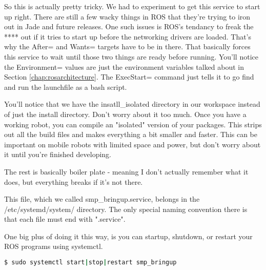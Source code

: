 So this is actually pretty tricky. We had to experiment to get this service to start up right. There are still a few wacky things in ROS that they're trying to iron out in Jade and future releases. One such issues is ROS's tendancy to freak the **** out if it tries to start up before the networking drivers are loaded. That's why the After= and Wants= targets have to be in there. That basically forces this service to wait until those two things are ready before running. You'll notice the Environment= values are just the environment variables talked about in Section \ref{chap:rosarchitecture}. The ExecStart= command just tells it to go find and run the launchfile as a bash script.

You'll notice that we have the insatll\_isolated directory in our workspace instead of just the install directory. Don't worry about it too much. Once you have a working robot, you can compile an "isolated" version of your packages. This strips out all the build files and makes everything a bit smaller and faster. This can be important on mobile robots with limited space and power, but don't worry about it until you're finished developing.

The rest is basically boiler plate - meaning I don't actually remember what it does, but everything breaks if it's not there.

This file, which we called smp\_bringup.service, belongs in the /etc/systemd/system/ directory. The only special naming convention there is that each file must end with ".service".

One big plus of doing it this way, is you can startup, shutdown, or restart your ROS programs using systemctl.

\begin{lstlisting}[language=bash]
  $ sudo systemctl start|stop|restart smp_bringup
\end{lstlisting}
